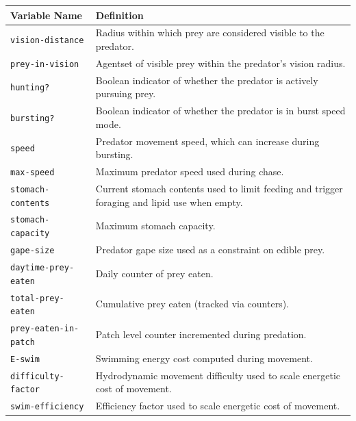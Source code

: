 \documentclass[
]{book}
\begin{document}
\begin{longtable}[]{@{}
  >{\raggedright\arraybackslash}p{}
  >{\raggedright\arraybackslash}p{}@{}}
\toprule\noalign{}
\begin{minipage}[b]{\linewidth}\raggedright
Variable Name
\end{minipage} & \begin{minipage}[b]{\linewidth}\raggedright
Definition
\end{minipage} \\
\midrule\noalign{}
\endhead
\bottomrule\noalign{}
\endlastfoot
\texttt{vision-distance} & Radius within which prey are considered visible to the predator. \\
\texttt{prey-in-vision} & Agentset of visible prey within the predator's vision radius. \\
\texttt{hunting?} & Boolean indicator of whether the predator is actively pursuing prey. \\
\texttt{bursting?} & Boolean indicator of whether the predator is in burst speed mode. \\
\texttt{speed} & Predator movement speed, which can increase during bursting. \\
\texttt{max-speed} & Maximum predator speed used during chase. \\
\texttt{stomach-contents} & Current stomach contents used to limit feeding and trigger foraging and lipid use when empty. \\
\texttt{stomach-capacity} & Maximum stomach capacity. \\
\texttt{gape-size} & Predator gape size used as a constraint on edible prey. \\
\texttt{daytime-prey-eaten} & Daily counter of prey eaten. \\
\texttt{total-prey-eaten} & Cumulative prey eaten (tracked via counters). \\
\texttt{prey-eaten-in-patch} & Patch level counter incremented during predation. \\
\texttt{E-swim} & Swimming energy cost computed during movement. \\
\texttt{difficulty-factor} & Hydrodynamic movement difficulty used to scale energetic cost of movement. \\
\texttt{swim-efficiency} & Efficiency factor used to scale energetic cost of movement. \\
\end{longtable}
\end{document}
